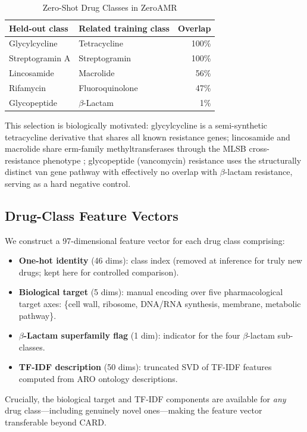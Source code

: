 \documentclass[conference]{IEEEtran}
\begin{document}
\begin{table}[h]
\centering
\caption{Zero-Shot Drug Classes in ZeroAMR}
\label{tab:zs_classes}
\begin{tabular}{llr}
\toprule
\textbf{Held-out class} & \textbf{Related training class} & \textbf{Overlap} \\
\midrule
Glycylcycline          & Tetracycline           & 100\% \\
Streptogramin A        & Streptogramin          & 100\% \\
Lincosamide            & Macrolide              &  56\% \\
Rifamycin              & Fluoroquinolone        &  47\% \\
Glycopeptide           & $\beta$-Lactam         &   1\% \\
\bottomrule
\end{tabular}
\end{table}

This selection is biologically motivated: glycylcycline is a
semi-synthetic tetracycline derivative that shares all known resistance
genes; lincosamide and macrolide share erm-family methyltransferases
through the MLSB cross-resistance phenotype \cite{Leclercq2002mlsb};
glycopeptide (vancomycin) resistance uses the structurally distinct van
gene pathway with effectively no overlap with $\beta$-lactam resistance,
serving as a hard negative control.

\subsection{Drug-Class Feature Vectors}
\label{sec:features}
We construct a 97-dimensional feature vector for each drug class
comprising:
\begin{itemize}
  \item \textbf{One-hot identity} (46 dims): class index (removed at
        inference for truly new drugs; kept here for controlled
        comparison).
  \item \textbf{Biological target} (5 dims): manual encoding over five
        pharmacological target axes: \{cell wall, ribosome, DNA/RNA
        synthesis, membrane, metabolic pathway\}.
  \item \textbf{$\beta$-Lactam superfamily flag} (1 dim): indicator for
        the four $\beta$-lactam sub-classes.
  \item \textbf{TF-IDF description} (50 dims): truncated SVD of
        TF-IDF features computed from ARO ontology descriptions.
\end{itemize}
Crucially, the biological target and TF-IDF components are available
for \emph{any} drug class—including genuinely novel ones—making the
feature vector transferable beyond CARD.
\end{document}

